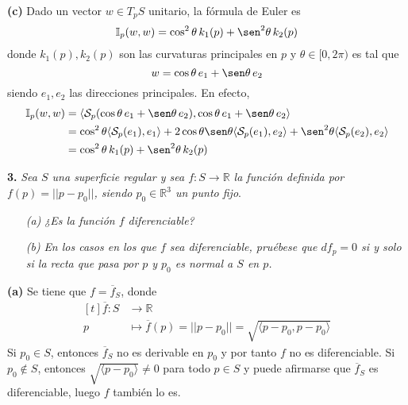 \documentclass[12pt]{report}
\newcommand{\R}{\mathbb R}
\begin{document}
\vspace{2mm}
\textbf{(c)} Dado un vector $w \in T_pS$ unitario, la fórmula de Euler es
\[\mathbb{I}_p(w,w) = \cos^2\theta \, k_1(p) + \sen^2\theta \, k_2(p)\]
donde $k_1(p),k_2(p)$ son las curvaturas principales en $p$ y $\theta \in [0,2\pi)$ es tal que
\[w = \cos\theta \, e_1 + \sen\theta \, e_2\]
siendo $e_1,e_2$ las direcciones principales. En efecto,
\[
\begin{aligned}[t]
\mathbb{I}_p(w,w) &= \langle \mathcal{S}_p(\cos\theta \, e_1 + \sen\theta \, e_2),\cos\theta \, e_1 + \sen\theta \, e_2 \rangle \\
&= \cos^2\theta \langle \mathcal{S}_p(e_1),e_1 \rangle + 2\cos \theta \sen \theta \langle \mathcal{S}_p(e_1),e_2 \rangle + \sen^2\theta \langle \mathcal{S}_p(e_2),e_2 \rangle \\
&= \cos^2\theta \, k_1(p) + \sen^2\theta \, k_2(p)
\end{aligned}
\]

\vspace{4mm}
\textbf{3.} \textit{Sea $S$ una superficie regular y sea $f \colon S \to \R$ la función definida por $f(p) = ||p-p_0||$, siendo $p_0 \in \R^3$ un punto fijo}.
\begin{itemize}
    \item[\textit{(a)}] \textit{¿Es la función $f$ diferenciable?}
    \item[\textit{(b)}] \textit{En los casos en los que $f$ sea diferenciable, pruébese que $df_p = 0$ si y solo si la recta que pasa por $p$ y $p_0$ es normal a $S$ en $p$.}
\end{itemize}

\vspace{2mm}
\textbf{(a) } Se tiene que $f = \overline{f}_S$, donde
\[
\begin{aligned}[t]
    \overline{f} \colon S &\longrightarrow \R \\
    p &\longmapsto \overline{f}(p) = ||p-p_0|| = \sqrt{\langle p-p_0,p-p_0 \rangle} 
\end{aligned}
\]
Si $p_0 \in S$, entonces $\overline{f}_S$ no es derivable en $p_0$ y por tanto $f$ no es diferenciable. Si $p_0 \notin S$, entonces $\sqrt{\langle p-p_0 \rangle} \neq 0$ para todo $p \in S$ y puede afirmarse que $\overline{f}_S$ es diferenciable, luego $f$ también lo es.
\end{document}
